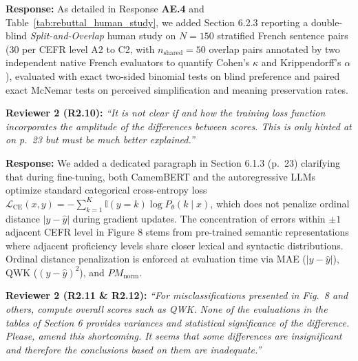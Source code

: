 \documentclass[11pt,a4paper]{article}
\begin{document}
\noindent\textbf{Response:}
As detailed in Response \textbf{AE.4} and Table~\ref{tab:rebuttal_human_study}, we added Section 6.2.3 reporting a double-blind \textit{Split-and-Overlap} human study on $N = 150$ stratified French sentence pairs (30 per CEFR level A2 to C2, with $n_{\text{shared}} = 50$ overlap pairs annotated by two independent native French evaluators to quantify Cohen's $\kappa$ and Krippendorff's $\alpha$), evaluated with exact two-sided binomial tests on blind preference and paired exact McNemar tests on perceived simplification and meaning preservation rates.

\begin{reviewbox}
\textbf{Reviewer 2 (R2.10):} \textit{``It is not clear if and how the training loss function incorporates the amplitude of the differences between scores. This is only hinted at on p.\ 23 but must be much better explained.''}
\end{reviewbox}

\noindent\textbf{Response:}
We added a dedicated paragraph in Section 6.1.3 (p.\ 23) clarifying that during fine-tuning, both CamemBERT and the autoregressive LLMs optimize standard categorical cross-entropy loss $\mathcal{L}_{\text{CE}}(x, y) = -\sum_{k=1}^{K} \mathbb{I}(y = k) \log P_{\theta}(k \mid x)$, which does not penalize ordinal distance $|y - \hat{y}|$ during gradient updates. The concentration of errors within $\pm 1$ adjacent CEFR level in Figure 8 stems from pre-trained semantic representations where adjacent proficiency levels share closer lexical and syntactic distributions. Ordinal distance penalization is enforced at evaluation time via MAE ($|y - \hat{y}|$), QWK ($(y - \hat{y})^2$), and $PM_{\text{norm}}$.

\begin{reviewbox}
\textbf{Reviewer 2 (R2.11 \& R2.12):} \textit{``For misclassifications presented in Fig.\ 8 and others, compute overall scores such as QWK. None of the evaluations in the tables of Section 6 provides variances and statistical significance of the difference. Please, amend this shortcoming. It seems that some differences are insignificant and therefore the conclusions based on them are inadequate.''}
\end{reviewbox}
\end{document}
